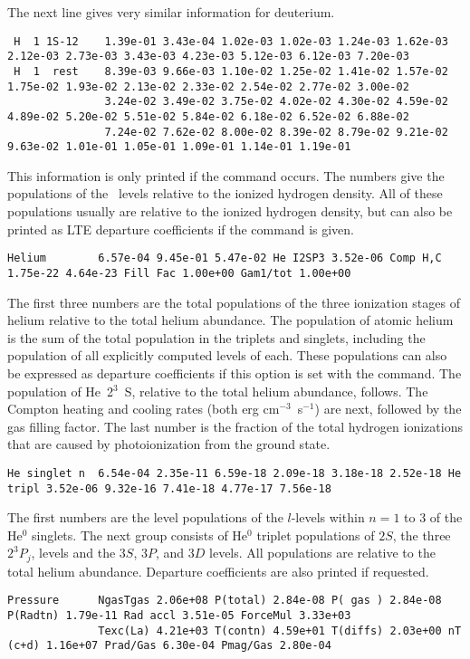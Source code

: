 The next line gives very similar information for deuterium.

{\setverbatimfontsize{\tiny}
\begin{verbatim}
 H  1 1S-12    1.39e-01 3.43e-04 1.02e-03 1.02e-03 1.24e-03 1.62e-03 2.12e-03 2.73e-03 3.43e-03 4.23e-03 5.12e-03 6.12e-03 7.20e-03
 H  1  rest    8.39e-03 9.66e-03 1.10e-02 1.25e-02 1.41e-02 1.57e-02 1.75e-02 1.93e-02 2.13e-02 2.33e-02 2.54e-02 2.77e-02 3.00e-02
               3.24e-02 3.49e-02 3.75e-02 4.02e-02 4.30e-02 4.59e-02 4.89e-02 5.20e-02 5.51e-02 5.84e-02 6.18e-02 6.52e-02 6.88e-02
               7.24e-02 7.62e-02 8.00e-02 8.39e-02 8.79e-02 9.21e-02 9.63e-02 1.01e-01 1.05e-01 1.09e-01 1.14e-01 1.19e-01
\end{verbatim}
}
This information is only printed if the
 command occurs.
The numbers give the populations of the \hO\ levels relative to the
ionized hydrogen density.
All of these populations usually are relative
to the ionized hydrogen density, but can also be printed as LTE departure
coefficients if the  command
is given.
{\setverbatimfontsize{\tiny}
\begin{verbatim}
Helium        6.57e-04 9.45e-01 5.47e-02 He I2SP3 3.52e-06 Comp H,C 1.75e-22 4.64e-23 Fill Fac 1.00e+00 Gam1/tot 1.00e+00
\end{verbatim}
}

The first three numbers are the total populations of the three ionization
stages of helium relative to the total helium abundance.
The population
of atomic helium is the sum of the total population in the triplets and
singlets, including the population of all explicitly computed levels of
each.
These populations can also be expressed as departure coefficients
if this option is set with the  command.
The
population of He~2$^3$~S, relative to the total helium abundance, follows.
The Compton heating and cooling rates (both erg cm$^{-3}$~s$^{-1}$) are next, followed
by the gas filling factor.
The last number is the fraction of the total
hydrogen ionizations that are caused by photoionization from the ground
state.
{\setverbatimfontsize{\tiny}
\begin{verbatim}
He singlet n  6.54e-04 2.35e-11 6.59e-18 2.09e-18 3.18e-18 2.52e-18 He tripl 3.52e-06 9.32e-16 7.41e-18 4.77e-17 7.56e-18
\end{verbatim}
}

The first numbers are the level populations of the $l$-levels within
$n=1$ to 3 of the He$^0$ singlets.
The next group consists of He$^0$ triplet populations
of $2S$, the three $2^3P_j$, levels and the $3S$, $3P$, and $3D$ levels.  All populations
are relative to the total helium abundance.
Departure coefficients are
also printed if requested.
{\setverbatimfontsize{\tiny}
\begin{verbatim}
Pressure      NgasTgas 2.06e+08 P(total) 2.84e-08 P( gas ) 2.84e-08 P(Radtn) 1.79e-11 Rad accl 3.51e-05 ForceMul 3.33e+03
              Texc(La) 4.21e+03 T(contn) 4.59e+01 T(diffs) 2.03e+00 nT (c+d) 1.16e+07 Prad/Gas 6.30e-04 Pmag/Gas 2.80e-04
\end{verbatim}
}

